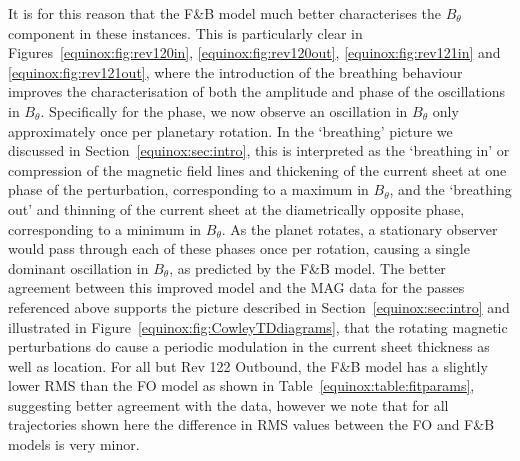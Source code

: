It is for this reason that the F{\&}B model much better characterises the $B_{\theta}$ component in these instances. This is particularly clear in Figures~\ref{equinox:fig:rev120in}, \ref{equinox:fig:rev120out}, \ref{equinox:fig:rev121in} and \ref{equinox:fig:rev121out}, where the introduction of the breathing behaviour improves the characterisation of both the amplitude and phase of the oscillations in $B_{\theta}$. Specifically for the phase, we now observe an oscillation in $B_{\theta}$ only approximately once per planetary rotation. In the `breathing' picture we discussed in Section~\ref{equinox:sec:intro}, this is interpreted as the `breathing in' or compression of the magnetic field lines and thickening of the current sheet at one phase of the perturbation, corresponding to a maximum in $B_{\theta}$, and the `breathing out' and thinning of the current sheet at the diametrically opposite phase, corresponding to a minimum in $B_{\theta}$. As the planet rotates, a stationary observer would pass through each of these phases once per rotation, causing a single dominant oscillation in $B_{\theta}$, as predicted by the F{\&}B model. The better agreement between this improved model and the MAG data for the passes referenced above supports the picture described in Section~\ref{equinox:sec:intro} and illustrated in Figure~\ref{equinox:fig:CowleyTDdiagrams}, that the rotating magnetic perturbations do cause a periodic modulation in the current sheet thickness as well as location. For all but Rev 122 Outbound, the F{\&}B model has a slightly lower RMS than the FO model as shown in Table~\ref{equinox:table:fitparams}, suggesting better agreement with the data, however we note that for all trajectories shown here the difference in RMS values between the FO and F\&B models is very minor.

